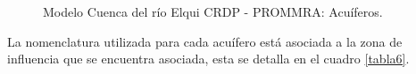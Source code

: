 \documentclass[11pt,]{article}
\begin{document}
\begin{figure}[H]
\begin{center}
\caption{Modelo Cuenca del río Elqui CRDP - PROMMRA: Acuíferos.}
\label{etiqueta_figura9}
\end{center}
\end{figure}

La nomenclatura utilizada para cada acuífero está asociada a la zona de influencia que se encuentra asociada, esta se detalla en el cuadro \ref{tabla6}.\\
\end{document}
